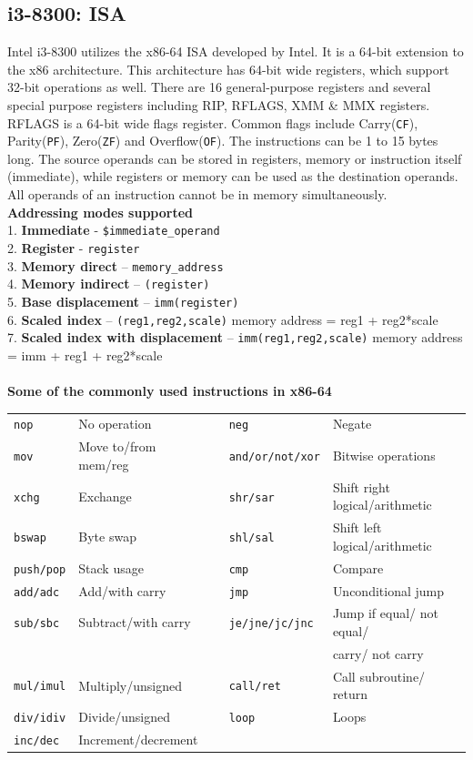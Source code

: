 \documentclass[a4paper,11pt]{article}
\begin{document}
\subsection{i3-8300: ISA}
Intel i3-8300 utilizes the x86-64 ISA developed by Intel. It is a 64-bit extension to the x86 architecture. This architecture has 64-bit wide registers, which support 32-bit operations as well. There are 16 general-purpose registers and several special purpose registers including RIP, RFLAGS, XMM \& MMX registers. RFLAGS is a 64-bit wide flags register. Common flags include Carry({\tt CF}), Parity({\tt PF}), Zero({\tt ZF}) and Overflow({\tt OF}). The instructions can be 1 to 15 bytes long. The source operands can be stored in registers, memory or instruction itself (immediate), while registers or memory can be used as the destination operands. All operands of an instruction cannot be in memory simultaneously.\\
\textbf{Addressing modes supported\cite{x64asm}}\\
1. \textbf{Immediate} - {\tt \$immediate\_operand}\\
2. \textbf{Register} - {\tt register}\\
3. \textbf{Memory direct} – {\tt memory\_address}\\
4. \textbf{Memory indirect} – {\tt (register)}\\
5. \textbf{Base displacement} – {\tt imm(register)}\\
6. \textbf{Scaled index} – {\tt (reg1,reg2,scale)} memory address = reg1 + reg2*scale\\
7. \textbf{Scaled index with displacement} – {\tt imm(reg1,reg2,scale)} memory address = imm + reg1 + reg2*scale\\\\
\textbf{Some of the commonly used instructions in x86-64}\cite{i3dev}\\
\begin{tabular}{l l c l l}
{\tt nop} & No operation & & {\tt neg} & Negate\\
{\tt mov} & Move to/from mem/reg & & {\tt and/or/not/xor} & Bitwise operations\\
{\tt xchg} & Exchange & & {\tt shr/sar} & Shift right logical/arithmetic\\
{\tt bswap} & Byte swap & & {\tt shl/sal} & Shift left logical/arithmetic\\
{\tt push/pop} & Stack usage & & {\tt cmp} & Compare\\
{\tt add/adc} & Add/with carry & & {\tt jmp} & Unconditional jump\\
{\tt sub/sbc} & Subtract/with carry & & {\tt je/jne/jc/jnc} & Jump if equal/ not equal/\\
& & & & carry/ not carry\\
{\tt mul/imul} & Multiply/unsigned & & {\tt call/ret} & Call subroutine/ return\\
{\tt div/idiv} & Divide/unsigned & & {\tt loop} & Loops\\
{\tt inc/dec} & Increment/decrement\\
\end{tabular}
\end{document}
